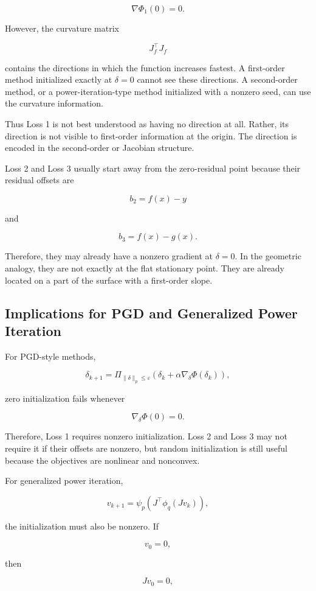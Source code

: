 \documentclass{article}
\begin{document}
\[
\nabla\Phi_1(0)=0.
\]

However, the curvature matrix

\[
J_f^\top J_f
\]

contains the directions in which the function increases fastest. A first-order method initialized exactly at \(\delta=0\) cannot see these directions. A second-order method, or a power-iteration-type method initialized with a nonzero seed, can use the curvature information.

Thus Loss 1 is not best understood as having no direction at all. Rather, its direction is not visible to first-order information at the origin. The direction is encoded in the second-order or Jacobian structure.

Loss 2 and Loss 3 usually start away from the zero-residual point because their residual offsets are

\[
b_2=f(x)-y
\]

and

\[
b_3=f(x)-g(x).
\]

Therefore, they may already have a nonzero gradient at \(\delta=0\). In the geometric analogy, they are not exactly at the flat stationary point. They are already located on a part of the surface with a first-order slope.

\subsection{Implications for PGD and Generalized Power Iteration}

For PGD-style methods,

\[
\delta_{k+1}
=
\Pi_{\|\delta\|_p\le\varepsilon}
\left(
\delta_k+\alpha\nabla_\delta\Phi(\delta_k)
\right),
\]

zero initialization fails whenever

\[
\nabla_\delta\Phi(0)=0.
\]

Therefore, Loss 1 requires nonzero initialization. Loss 2 and Loss 3 may not require it if their offsets are nonzero, but random initialization is still useful because the objectives are nonlinear and nonconvex.

For generalized power iteration,

\[
v_{k+1}
=
\psi_p
\left(
J^\top\phi_q(Jv_k)
\right),
\]

the initialization must also be nonzero. If

\[
v_0=0,
\]

then

\[
Jv_0=0,
\]
\end{document}
